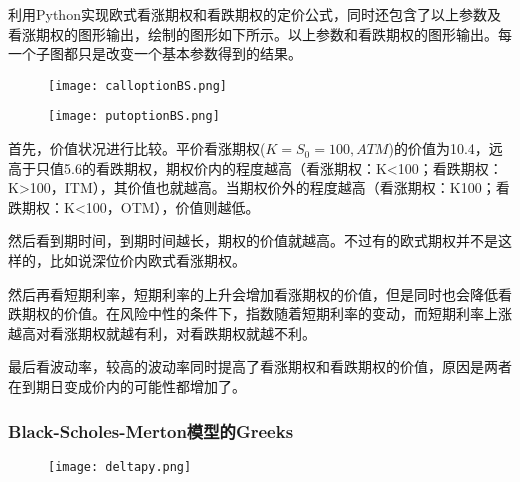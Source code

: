 	利用Python实现欧式看涨期权和看跌期权的定价公式，同时还包含了以上参数及看涨期权的图形输出，绘制的图形如下所示。以上参数和看跌期权的图形输出。每一个子图都只是改变一个基本参数得到的结果。
	
	
	
	\begin{figure}[htb] %
		\centering
		\texttt{[image: calloptionBS.png]}
		\label{fig:xfig1}
	\end{figure}
	
	\begin{figure}[htb] %
		\centering
		\texttt{[image: putoptionBS.png]}
		\label{fig:xfig1}
	\end{figure}
	
	首先，价值状况进行比较。平价看涨期权($K=S_{0}=100,ATM$)的价值为10.4，远高于只值5.6的看跌期权，期权价内的程度越高（看涨期权：K<100；看跌期权：K>100，ITM），其价值也就越高。当期权价外的程度越高（看涨期权：K100；看跌期权：K<100，OTM），价值则越低。
	
	然后看到期时间，到期时间越长，期权的价值就越高。不过有的欧式期权并不是这样的，比如说深位价内欧式看涨期权。
	
	然后再看短期利率，短期利率的上升会增加看涨期权的价值，但是同时也会降低看跌期权的价值。在风险中性的条件下，指数随着短期利率的变动，而短期利率上涨越高对看涨期权就越有利，对看跌期权就越不利。
	
	最后看波动率，较高的波动率同时提高了看涨期权和看跌期权的价值，原因是两者在到期日变成价内的可能性都增加了。
	
	
	
	
	
	
	
\subsubsection{Black-Scholes-Merton模型的Greeks}
	
	
	
	\begin{figure}[htb] %
		\centering
		\texttt{[image: deltapy.png]}
		\label{fig:xfig1}
	\end{figure}
	
	
	
